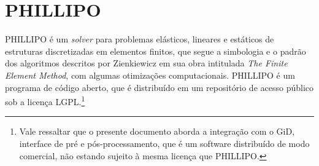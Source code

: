

\chapter{PHILLIPO}

PHILLIPO é um \emph{solver} para problemas elásticos, lineares e estáticos de estruturas discretizadas em elementos finitos, que segue a simbologia e o padrão dos algoritmos descritos por Zienkiewicz em sua obra intitulada \emph{The Finite Element Method}, com algumas otimizações computacionais. PHILLIPO é um programa de código aberto, que é distribuído em um repositório de acesso público sob a licença LGPL.\footnote{Vale ressaltar que o presente documento aborda a integração com o GiD, interface de pré e pós-processamento, que é um software distribuído de modo comercial, não estando sujeito à mesma licença que PHILLIPO.}